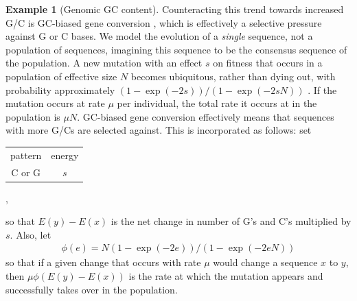 \documentclass{article}
\newcommand{\nC}{\mbox{C}}
\newcommand{\nG}{\mbox{G}}
\theoremstyle{plain}
\theoremstyle{definition}
\newtheorem{example}{Example}[section]
\begin{document}
\begin{example}[Genomic GC content]
    Counteracting this trend towards increased G/C is GC-biased gene conversion \citep{gcbiased},
    which is effectively a selective pressure against G or C bases.
    We model the evolution of a \emph{single} sequence, not a population of sequences,
    imagining this sequence to be the consensus sequence of the population.
    A new mutation with an effect $s$ on fitness that occurs
    in a population of effective size $N$ becomes ubiquitous, rather than dying out,
    with probability approximately $(1-\exp(-2 s))/(1-\exp(-2 s N))$ \citep{fixation_prob}.
    If the mutation occurs at rate $\mu$ per individual, the total rate it occurs at in the population is $\mu N$.
    GC-biased gene conversion effectively means that sequences with more G/Cs are selected against.
    This is incorporated as follows: set
    \begin{center}
        \begin{tabular}{cc}
        pattern  &  energy \\
        \nC{} or \nG   &  $s$   
      \end{tabular} ,
    \end{center}
    so that $E(y)-E(x)$ is the net change in number of G's and C's multiplied by $s$.
    Also, let
    \begin{align*}
        \phi(e) = N (1-\exp(-2e))/(1-\exp(-2eN))
    \end{align*}
    so that if a given change that occurs with rate $\mu$ would change a sequence $x$ to $y$,
    then $\mu \phi(E(y)-E(x))$ is the rate at which the mutation appears and successfully takes over in the population.

\end{example}
\end{document}
